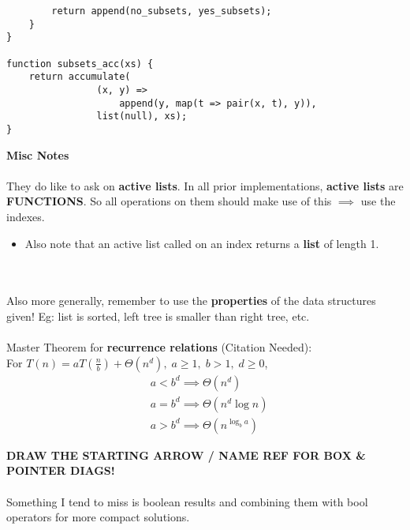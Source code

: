 \documentclass[a4paper]{article} \usepackage[backend=biber, style=numeric, sorting=none]{biblatex}
\begin{document}
\begin{multicols*}{4}
\begin{verbatim}
        return append(no_subsets, yes_subsets);
    }
}

function subsets_acc(xs) {
    return accumulate(
                (x, y) =>
                    append(y, map(t => pair(x, t), y)),
                list(null), xs);
}

\end{verbatim}

\vfill\null
\columnbreak

{\small\textbf{Misc Notes}}
\\ \\
They do like to ask on \textbf{active lists}. In all prior implementations, \textbf{active lists} are \textbf{FUNCTIONS}. So all operations on them should make use of this $\implies$ use the indexes. 
\begin{itemize}
    \item Also note that an active list called on an index returns a \textbf{list} of length 1.
\end{itemize}

\\ \\
Also more generally, remember to use the \textbf{properties} of the data structures given! Eg: list is sorted, left tree is smaller than right tree, etc. 
\\ \\
Master Theorem for \textbf{recurrence relations} (Citation Needed): \\
For $T(n) = aT(\frac{n}{b}) + \Theta({n^d}), \; a \geq 1, \; b >  1, \; d \geq 0$,
\begin{align*}
& a < b^d \implies \Theta(n^d) \\
& a = b^d \implies \Theta(n^d \log n) \\
& a > b^d \implies \Theta(n^{\log_b a})
\end{align*}

{\textbf{DRAW THE STARTING ARROW / NAME REF FOR BOX \& POINTER DIAGS!}} 
\\ \\ 
Something I tend to miss is boolean results and combining them with bool operators for more compact solutions. 

\end{multicols*}
\end{document}
